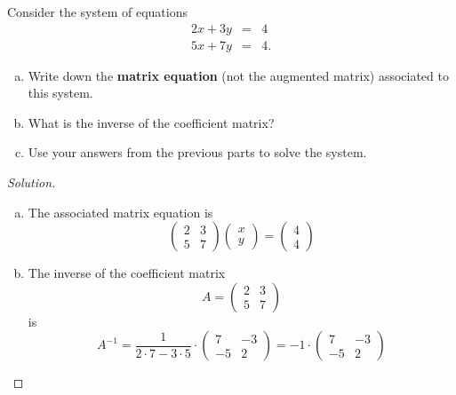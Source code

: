 \documentclass[12pt]{amsart}
\begin{document}
\begin{thm}[20 Points]\label{ex1}
  Consider the system of equations
  \begin{eqnarray*}
    2x + 3y &=& 4\\
    5x + 7y &=& 4.
  \end{eqnarray*}
  \begin{enumerate}[(a)]
  \item\label{1.a}
    Write down the {\bf matrix equation} (not the augmented matrix) associated to this system.
  \item
    What is the inverse of the coefficient matrix?
  \item
    Use your answers from the previous parts to solve the system.
  \end{enumerate}
  \begin{proof}[Solution]
    \begin{enumerate}[(a)]
    \item
      The associated matrix equation is
      $$\left(\begin{array}{cc}
        2 & 3\\
        5 & 7
      \end{array}
      \right)
      \left(\begin{array}{c}
        x\\
        y
      \end{array}
      \right)
      =
      \left(\begin{array}{c}
        4\\
        4
      \end{array}
      \right)$$
    \item
      The inverse of the coefficient matrix
      $$A = \left(\begin{array}{cc}
        2 & 3\\
        5 & 7
      \end{array}
      \right)$$
      is
      $$A^{-1} = \frac{1}{2\cdot 7 - 3 \cdot 5} \cdot \left(\begin{array}{ccc}
            7 & -3\\
            -5 & 2
        \end{array}
      \right) = 
      -1 \cdot \left(\begin{array}{ccc}
            7 & -3\\
            -5 & 2
        \end{array}
      \right)
$$
\end{enumerate}
\end{proof}
\end{thm}
\end{document}
